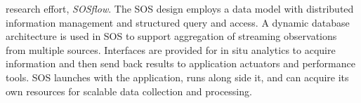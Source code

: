 research effort, \textit{SOSflow}.
%
%
The SOS design employs a data model with distributed
information management and structured query and access.
%
A dynamic database architecture is used in SOS to support aggregation
of streaming observations from multiple sources.
%
%
Interfaces are provided for in situ analytics to acquire
information and then send back results to application actuators
and performance tools.
%
SOS launches with the application, runs along side it, and can acquire
its own resources for scalable data collection and processing.
%


